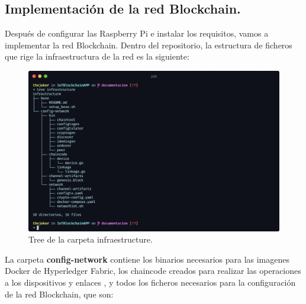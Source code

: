 \newpage

\subsection{Implementación de la red Blockchain.}

Después de configurar las Raspberry Pi e instalar los requisitos, vamos a implementar la red Blockchain.
Dentro del repositorio, la estructura de ficheros que rige la infraestructura de la red es la siguiente:

\begin{figure}[ht!]
  \centering
  \includegraphics[width=\textwidth]{imagenes/desarrollo/tree_infraestructure}
  \caption{Tree de la carpeta infraestructure.}
  \label{fig:tree-infraestructure}
\end{figure}

\vspace{5mm}

\noindent La carpeta \textbf{config-network} contiene los binarios necesarios para las imagenes Docker de Hyperledger 
Fabric, los chaincode creados para realizar las operaciones a los dispositivos y enlaces 
\cite{developing-chaincode-nodejs}, y todos los ficheros necesarios para la configuración de la red Blockchain, que son: 

